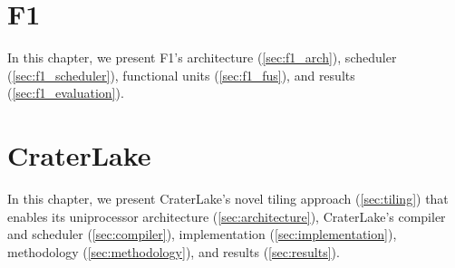 \documentclass[12pt,twoside]{mitthesis}
\begin{document}

% 
\pagestyle{plain}




\chapter{F1}

In this chapter, we present F1's architecture (\autoref{sec:f1_arch}),
scheduler (\autoref{sec:f1_scheduler}), functional units
(\autoref{sec:f1_fus}), and results (\autoref{sec:f1_evaluation}).






\chapter{CraterLake}\label{ch:craterlake}

In this chapter, we present CraterLake's novel tiling approach
(\autoref{sec:tiling}) that enables its uniprocessor architecture
(\autoref{sec:architecture}), CraterLake's compiler and scheduler
(\autoref{sec:compiler}), implementation (\autoref{sec:implementation}),
methodology (\autoref{sec:methodology}), and results (\autoref{sec:results}).










\begin{singlespacing}

\end{singlespacing}
\end{document}
